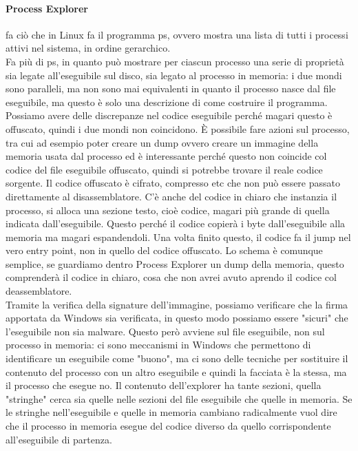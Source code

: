 \documentclass[12pt, oneside]{extbook}
\begin{document}
\paragraph{Process Explorer} fa ciò che in Linux fa il programma ps, ovvero mostra una lista di tutti i processi attivi nel sistema, in ordine gerarchico.\\ Fa più di ps, in quanto può mostrare per ciascun processo una serie di proprietà sia legate all'eseguibile sul disco, sia legato al processo in memoria: i due mondi sono paralleli, ma non sono mai equivalenti in quanto il processo nasce dal file eseguibile, ma questo è solo una descrizione di come costruire il programma. Possiamo avere delle discrepanze nel codice eseguibile perché magari questo è offuscato, quindi i due mondi non coincidono. È possibile fare azioni sul processo, tra cui ad esempio poter creare un dump ovvero creare un immagine della memoria usata dal processo ed è interessante perché questo non coincide col codice del file eseguibile offuscato, quindi si potrebbe trovare il reale codice sorgente. Il codice offuscato è cifrato, compresso etc che non può essere passato direttamente al disassemblatore. C'è anche del codice in chiaro che instanzia il processo, si alloca una sezione testo, cioè codice, magari più grande di quella indicata dall'eseguibile. Questo perché il codice copierà i byte dall'eseguibile alla memoria ma magari espandendoli. Una volta finito questo, il codice fa il jump nel vero entry point, non in quello del codice offuscato. Lo schema è comunque semplice, se guardiamo dentro Process Explorer un dump della memoria, questo comprenderà il codice in chiaro, cosa che non avrei avuto aprendo il codice col deassemblatore.\\ Tramite la verifica della signature dell'immagine, possiamo verificare che la firma apportata da Windows sia verificata, in questo modo possiamo essere "sicuri" che l'eseguibile non sia malware. Questo però avviene sul file eseguibile, non sul processo in memoria: ci sono meccanismi in Windows che permettono di identificare un eseguibile come "buono", ma ci sono delle tecniche per sostituire il contenuto del processo con un altro eseguibile e quindi la facciata è la stessa, ma il processo che esegue no. Il contenuto dell'explorer ha tante sezioni, quella "stringhe" cerca sia quelle nelle sezioni del file eseguibile che quelle in memoria. Se le stringhe nell'eseguibile e quelle in memoria cambiano radicalmente vuol dire che il processo in memoria esegue del codice diverso da quello corrispondente all'eseguibile di partenza.
\\
\end{document}
